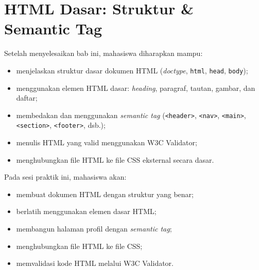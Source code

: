 
\chapter{HTML Dasar: Struktur \& Semantic Tag}
\label{chap:minggu-03}

\begin{capaian}
Setelah menyelesaikan bab ini, mahasiswa diharapkan mampu:
\begin{itemize}
  \item menjelaskan struktur dasar dokumen HTML (\emph{doctype}, \texttt{html}, \texttt{head}, \texttt{body});
  \item menggunakan elemen HTML dasar: \emph{heading}, paragraf, tautan, gambar, dan daftar;
  \item membedakan dan menggunakan \emph{semantic tag} (\texttt{<header>}, \texttt{<nav>}, \texttt{<main>}, \texttt{<section>}, \texttt{<footer>}, dsb.);
  \item menulis HTML yang valid menggunakan W3C Validator;
  \item menghubungkan file HTML ke file CSS eksternal secara dasar.
\end{itemize}
\end{capaian}

\begin{tujuanpraktik}
Pada sesi praktik ini, mahasiswa akan:
\begin{itemize}
  \item membuat dokumen HTML dengan struktur yang benar;
  \item berlatih menggunakan elemen dasar HTML;
  \item membangun halaman profil dengan \emph{semantic tag};
  \item menghubungkan file HTML ke file CSS;
  \item memvalidasi kode HTML melalui W3C Validator.
\end{itemize}
\end{tujuanpraktik}

